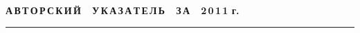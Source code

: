 
\def\stat{cont}
{%
\raggedleft\Large \bf%
А\,В\,Т\,О\,Р\,С\,К\,И\,Й\ \ У\,К\,А\,З\,А\,Т\,Е\,Л\,Ь\ \ З\,А\ \ 2\,0\,1\,1 г. \vskip 17pt
    \hrule
    \par
{} }

\label{st\stat}

\def\tit{\ }

\def\aut{\ }
\def\auf{\ }

\def\leftkol{\ } %

\def\rightkol{\ } %

\titele{\tit}{\aut}{\auf}{\leftkol}{\rightkol}

\vspace*{-12pt}

